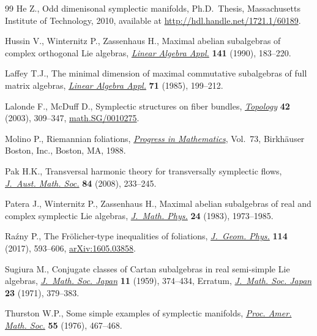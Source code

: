 \begin{thebibliography}{99}
He Z., Odd dimenisonal symplectic manifolds, Ph.D.~Thesis, Massachusetts
 Institute of Technology, 2010, available at \url{http://hdl.handle.net/1721.1/60189}.

Hussin V., Winternitz P., Zassenhaus H., Maximal abelian subalgebras of complex
 orthogonal {L}ie algebras, \href{https://doi.org/10.1016/0024-3795(90)90317-6}{\textit{Linear Algebra Appl.}} \textbf{141} (1990),
 183--220.

Laffey T.J., The minimal dimension of maximal commutative subalgebras of full
 matrix algebras, \href{https://doi.org/10.1016/0024-3795(85)90247-2}{\textit{Linear Algebra Appl.}} \textbf{71} (1985), 199--212.

Lalonde F., McDuff D., Symplectic structures on fiber bundles,
 \href{https://doi.org/10.1016/S0040-9383(01)00020-9}{\textit{Topology}} \textbf{42} (2003), 309--347, \href{https://arxiv.org/abs/math.SG/0010275}{math.SG/0010275}.

Molino P., Riemannian foliations, \href{https://doi.org/10.1007/978-1-4684-8670-4}{\textit{Progress in Mathematics}}, Vol.~73,
 Birkh\"auser Boston, Inc., Boston, MA, 1988.

Pak H.K., Transversal harmonic theory for transversally symplectic flows,
 \href{https://doi.org/10.1017/S1446788708000190}{\textit{J.~Aust. Math. Soc.}} \textbf{84} (2008), 233--245.

Patera J., Winternitz P., Zassenhaus H., Maximal abelian subalgebras of
 real and complex symplectic {L}ie algebras, \href{https://doi.org/10.1063/1.525955}{\textit{J.~Math. Phys.}}
 \textbf{24} (1983), 1973--1985.

Ra\'zny P., The {F}r\"olicher-type inequalities of foliations, \href{https://doi.org/10.1016/j.geomphys.2017.01.005}{\textit{J.~Geom.
 Phys.}} \textbf{114} (2017), 593--606, \href{https://arxiv.org/abs/1605.03858}{arXiv:1605.03858}.

Sugiura M., Conjugate classes of {C}artan subalgebras in real semi-simple {L}ie
 algebras, \href{https://doi.org/10.2969/jmsj/01140374}{\textit{J.~Math. Soc. Japan}} \textbf{11} (1959), 374--434,
 {E}rratum, \href{https://doi.org/10.2969/jmsj/02320379}{\textit{J.~Math. Soc.
 Japan}} {\bf 23} (1971), 379--383.

Thurston W.P., Some simple examples of symplectic manifolds, \href{https://doi.org/10.2307/2041749}{\textit{Proc.
 Amer. Math. Soc.}} \textbf{55} (1976), 467--468.


\end{thebibliography}
